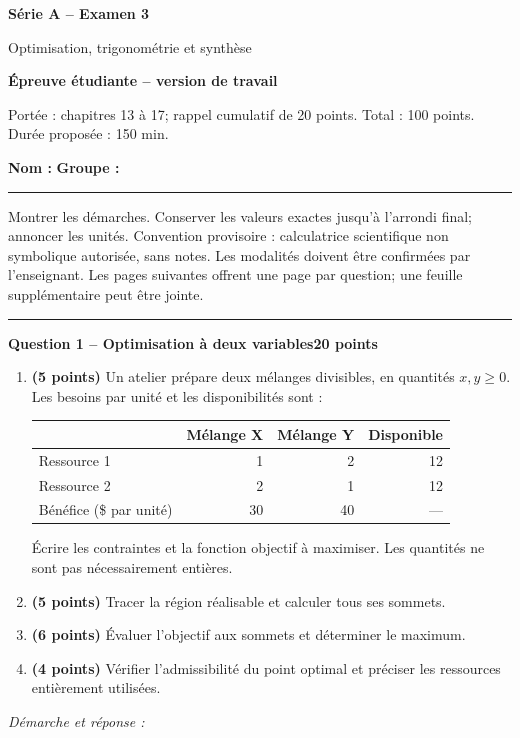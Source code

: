 \documentclass[11pt,a4paper]{article}
\begin{document}
{\LARGE\bfseries Série A -- Examen 3}\par
{\large Optimisation, trigonométrie et synthèse}\par
\textbf{Épreuve étudiante -- version de travail}\par
Portée : chapitres 13 à 17; rappel cumulatif de 20 points. Total : 100 points. Durée proposée : 150 min.\par
\textbf{Nom :} \hrulefill\quad \textbf{Groupe :} \rule{22mm}{0.3pt}\par
\small Montrer les démarches. Conserver les valeurs exactes jusqu’à l’arrondi final; annoncer les unités. Convention provisoire : calculatrice scientifique non symbolique autorisée, sans notes. Les modalités doivent être confirmées par l’enseignant. Les pages suivantes offrent une page par question; une feuille supplémentaire peut être jointe.\normalsize\par
\vspace{3mm}\hrule\vspace{4mm}
{\large\bfseries Question 1 -- Optimisation à deux variables}\hfill\textbf{20 points}\par
\begin{enumerate}
\item \textbf{(5 points)} Un atelier prépare deux mélanges divisibles, en quantités \(x,y\ge0\). Les besoins par unité et les disponibilités sont :
\begin{center}\begin{tabular}{lrrr}\toprule
& Mélange X & Mélange Y & Disponible\\\midrule
Ressource 1 & 1 & 2 & 12\\
Ressource 2 & 2 & 1 & 12\\
Bénéfice (\$ par unité) & 30 & 40 & ---\\\bottomrule
\end{tabular}\end{center}
Écrire les contraintes et la fonction objectif à maximiser. Les quantités ne sont pas nécessairement entières.
\item \textbf{(5 points)} Tracer la région réalisable et calculer tous ses sommets.
\item \textbf{(6 points)} Évaluer l’objectif aux sommets et déterminer le maximum.
\item \textbf{(4 points)} Vérifier l’admissibilité du point optimal et préciser les ressources entièrement utilisées.
\end{enumerate}
\vspace{3mm}\textit{Démarche et réponse :}\par\vfill
\end{document}
